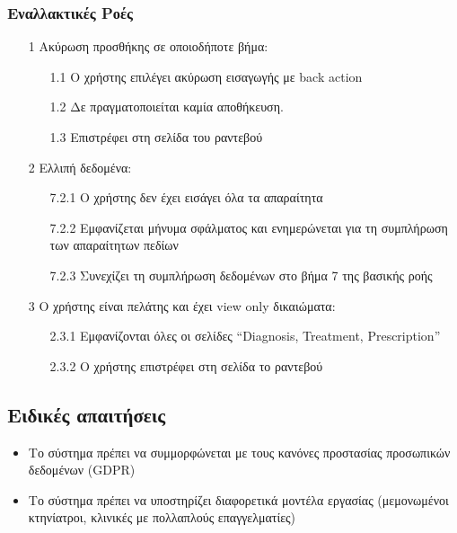 \documentclass[12pt,a4paper,twoside]{book}
\begin{document}
\subsubsection{Εναλλακτικές Ροές}
\begin{enumerate}
  \item[1 ] Ακύρωση προσθήκης σε οποιοδήποτε βήμα:  %
        \begin{enumerate}
          \item[1.1 ] Ο χρήστης επιλέγει ακύρωση εισαγωγής με back action  %
          \item[1.2 ] Δε πραγματοποιείται καμία αποθήκευση. %
          \item[1.3 ] Επιστρέφει στη σελίδα του ραντεβού  %
        \end{enumerate}
  \item[2 ] Ελλιπή δεδομένα:  %
        \begin{enumerate}
          \item[7.2.1 ] Ο χρήστης δεν έχει εισάγει όλα τα απαραίτητα  %
          \item[7.2.2 ] Εμφανίζεται μήνυμα σφάλματος και ενημερώνεται για τη συμπλήρωση των απαραίτητων πεδίων %
          \item[7.2.3 ] Συνεχίζει τη συμπλήρωση δεδομένων στο βήμα 7 της βασικής ροής %
        \end{enumerate}
  \item[3 ] Ο χρήστης είναι πελάτης και έχει view only δικαιώματα:  %
        \begin{enumerate}
          \item[2.3.1 ] Εμφανίζονται όλες οι σελίδες “Diagnosis, Treatment, Prescription” %
          \item[2.3.2 ] Ο χρήστης επιστρέφει στη σελίδα το ραντεβού  %
        \end{enumerate}
\end{enumerate}

\subsection{Ειδικές απαιτήσεις} %
\begin{itemize}
  \item Το σύστημα πρέπει να συμμορφώνεται με τους κανόνες προστασίας προσωπικών δεδομένων (GDPR)  %
  \item Το σύστημα πρέπει να υποστηρίζει διαφορετικά μοντέλα εργασίας (μεμονωμένοι κτηνίατροι, κλινικές με πολλαπλούς επαγγελματίες)  %
\end{itemize}
\end{document}
